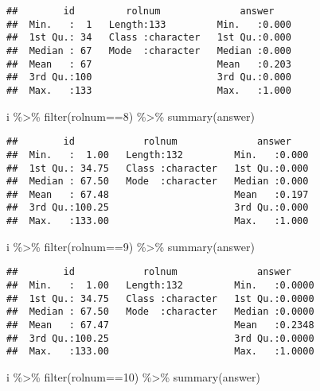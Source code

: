 \documentclass[
]{article}
\newenvironment{Shaded}{\begin{snugshade}}{\end{snugshade}}
\newcommand{\DecValTok}[1]{\textcolor[rgb]{0.00,0.00,0.81}{#1}}
\newcommand{\FunctionTok}[1]{\textcolor[rgb]{0.00,0.00,0.00}{#1}}
\newcommand{\NormalTok}[1]{#1}
\newcommand{\SpecialCharTok}[1]{\textcolor[rgb]{0.00,0.00,0.00}{#1}}
\begin{document}
\begin{enumerate}
\begin{verbatim}
##        id         rolnum              answer     
##  Min.   :  1   Length:133         Min.   :0.000  
##  1st Qu.: 34   Class :character   1st Qu.:0.000  
##  Median : 67   Mode  :character   Median :0.000  
##  Mean   : 67                      Mean   :0.203  
##  3rd Qu.:100                      3rd Qu.:0.000  
##  Max.   :133                      Max.   :1.000
\end{verbatim}

\begin{Shaded}
\begin{Highlighting}[]
\NormalTok{i }\SpecialCharTok{\%\textgreater{}\%} \FunctionTok{filter}\NormalTok{(rolnum}\SpecialCharTok{==}\DecValTok{8}\NormalTok{) }\SpecialCharTok{\%\textgreater{}\%} \FunctionTok{summary}\NormalTok{(answer)}
\end{Highlighting}
\end{Shaded}

\begin{verbatim}
##        id            rolnum              answer     
##  Min.   :  1.00   Length:132         Min.   :0.000  
##  1st Qu.: 34.75   Class :character   1st Qu.:0.000  
##  Median : 67.50   Mode  :character   Median :0.000  
##  Mean   : 67.48                      Mean   :0.197  
##  3rd Qu.:100.25                      3rd Qu.:0.000  
##  Max.   :133.00                      Max.   :1.000
\end{verbatim}

\begin{Shaded}
\begin{Highlighting}[]
\NormalTok{i }\SpecialCharTok{\%\textgreater{}\%} \FunctionTok{filter}\NormalTok{(rolnum}\SpecialCharTok{==}\DecValTok{9}\NormalTok{) }\SpecialCharTok{\%\textgreater{}\%} \FunctionTok{summary}\NormalTok{(answer)}
\end{Highlighting}
\end{Shaded}

\begin{verbatim}
##        id            rolnum              answer      
##  Min.   :  1.00   Length:132         Min.   :0.0000  
##  1st Qu.: 34.75   Class :character   1st Qu.:0.0000  
##  Median : 67.50   Mode  :character   Median :0.0000  
##  Mean   : 67.47                      Mean   :0.2348  
##  3rd Qu.:100.25                      3rd Qu.:0.0000  
##  Max.   :133.00                      Max.   :1.0000
\end{verbatim}

\begin{Shaded}
\begin{Highlighting}[]
\NormalTok{i }\SpecialCharTok{\%\textgreater{}\%} \FunctionTok{filter}\NormalTok{(rolnum}\SpecialCharTok{==}\DecValTok{10}\NormalTok{) }\SpecialCharTok{\%\textgreater{}\%} \FunctionTok{summary}\NormalTok{(answer)}
\end{Highlighting}
\end{Shaded}


\end{enumerate}
\end{document}
